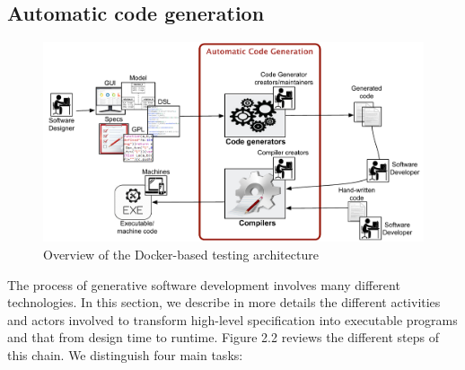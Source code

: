 \subsection{Automatic code generation}
\begin{figure}[h]
	\center
	\includegraphics[scale=0.65]{Background/fig/background_overview2.pdf}
	\caption{Overview of the Docker-based testing architecture}
\end{figure}
The process of generative software development involves many different technologies. In this section, we describe in more details the different activities and actors involved to transform high-level specification into executable programs and that from design time to runtime. 
Figure 2.2 reviews the different steps of this chain. We distinguish four main tasks: 
